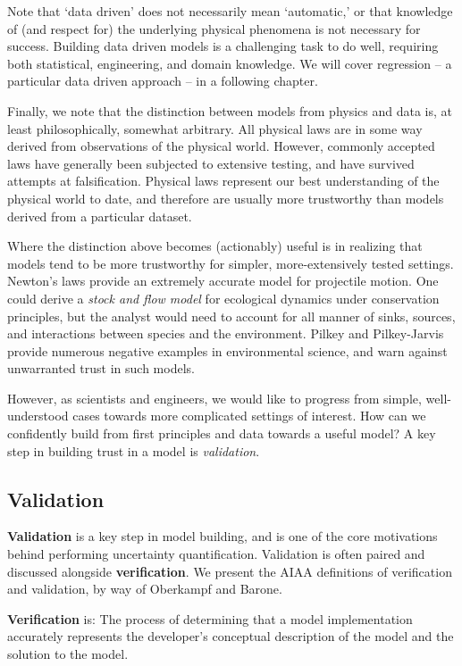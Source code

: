 \documentclass[../primer.tex]{subfiles}
\begin{document}
Note that `data driven' does not necessarily mean `automatic,' or that knowledge
of (and respect for) the underlying physical phenomena is not necessary for
success. Building data driven models is a challenging task to do well, requiring
both statistical, engineering, and domain knowledge. We will cover regression --
a particular data driven approach -- in a following chapter.

Finally, we note that the distinction between models from physics and data is,
at least philosophically, somewhat arbitrary. All physical laws are in some way
derived from observations of the physical world. However, commonly accepted laws
have generally been subjected to extensive testing, and have survived attempts
at falsification.\cite{popper2005logic} Physical laws represent our best
understanding of the physical world to date, and therefore are usually more
trustworthy than models derived from a particular dataset.

Where the distinction above becomes (actionably) useful is in realizing that
models tend to be more trustworthy for simpler, more-extensively tested
settings. Newton's laws provide an extremely accurate model for projectile
motion. One could derive a \emph{stock and flow model} for ecological dynamics
under conservation principles, but the analyst would need to account for all
manner of sinks, sources, and interactions between species and the environment.
Pilkey and Pilkey-Jarvis\cite{pilkey2007useless} provide numerous negative
examples in environmental science, and warn against unwarranted trust in such
models.

However, as scientists and engineers, we would like to progress from simple,
well-understood cases towards more complicated settings of interest. How can we
confidently build from first principles and data towards a useful model? A key
step in building trust in a model is \emph{validation}.

\subsection{Validation}
\textbf{Validation} is a key step in model building, and is one of the core
motivations behind performing uncertainty quantification. Validation is often
paired and discussed alongside \textbf{verification}. We present the AIAA
definitions of verification and validation, by way of Oberkampf and
Barone.\cite{oberkampf2006measures}

\textbf{Verification} is: The process of determining that a model implementation
accurately represents the developer's conceptual description of the model and
the solution to the model.
\end{document}
